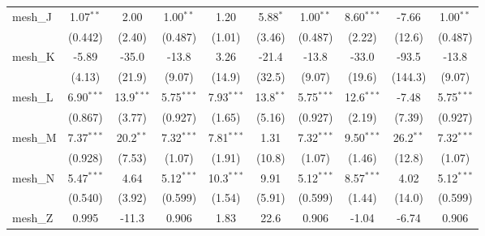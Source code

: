 \begin{tabular}{lccccccccc}
   mesh\_J                                                     & 1.07$^{**}$   & 2.00          & 1.00$^{**}$   & 1.20           & 5.88$^{*}$   & 1.00$^{**}$   & 8.60$^{***}$  & -7.66          & 1.00$^{**}$\\   
                                                               & (0.442)       & (2.40)        & (0.487)       & (1.01)         & (3.46)       & (0.487)       & (2.22)        & (12.6)         & (0.487)\\   
   mesh\_K                                                     & -5.89         & -35.0         & -13.8         & 3.26           & -21.4        & -13.8         & -33.0         & -93.5          & -13.8\\   
                                                               & (4.13)        & (21.9)        & (9.07)        & (14.9)         & (32.5)       & (9.07)        & (19.6)        & (144.3)        & (9.07)\\   
   mesh\_L                                                     & 6.90$^{***}$  & 13.9$^{***}$  & 5.75$^{***}$  & 7.93$^{***}$   & 13.8$^{**}$  & 5.75$^{***}$  & 12.6$^{***}$  & -7.48          & 5.75$^{***}$\\   
                                                               & (0.867)       & (3.77)        & (0.927)       & (1.65)         & (5.16)       & (0.927)       & (2.19)        & (7.39)         & (0.927)\\   
   mesh\_M                                                     & 7.37$^{***}$  & 20.2$^{**}$   & 7.32$^{***}$  & 7.81$^{***}$   & 1.31         & 7.32$^{***}$  & 9.50$^{***}$  & 26.2$^{**}$    & 7.32$^{***}$\\   
                                                               & (0.928)       & (7.53)        & (1.07)        & (1.91)         & (10.8)       & (1.07)        & (1.46)        & (12.8)         & (1.07)\\   
   mesh\_N                                                     & 5.47$^{***}$  & 4.64          & 5.12$^{***}$  & 10.3$^{***}$   & 9.91         & 5.12$^{***}$  & 8.57$^{***}$  & 4.02           & 5.12$^{***}$\\   
                                                               & (0.540)       & (3.92)        & (0.599)       & (1.54)         & (5.91)       & (0.599)       & (1.44)        & (14.0)         & (0.599)\\   
   mesh\_Z                                                     & 0.995         & -11.3         & 0.906         & 1.83           & 22.6         & 0.906         & -1.04         & -6.74          & 0.906\\   

\end{tabular}

